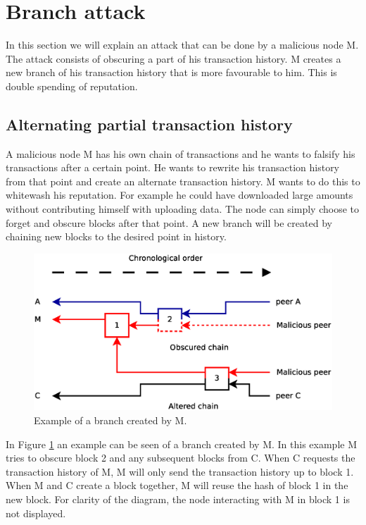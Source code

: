 \section{Branch attack}
\label{sect:branch}
In this section we will explain an attack that can be done by a malicious node M.
The attack consists of obscuring a part of his transaction history.
M creates a new branch of his transaction history that is more favourable to him.
This is double spending of reputation.

\subsection{Alternating partial transaction history}
A malicious node M has his own chain of transactions
and he wants to falsify his transactions after a certain point.
He wants to rewrite his transaction history from that point and create an alternate transaction history.
M wants to do this to whitewash his reputation.
For example he could have downloaded large amounts without contributing himself with uploading data.
The node can simply choose to forget and obscure blocks after that point.
A new branch will be created by chaining new blocks to the desired point in history.

\begin{figure}
	\centerline{\includegraphics[scale=0.3]{problems/figs/branch.eps}}
	\caption{Example of a branch created by M.}
	\label{fig:problem-branch-obscure}
\end{figure}

In Figure \ref{fig:problem-branch-obscure} an example can be seen of a branch created by M.
In this example M tries to obscure block 2 and any subsequent blocks from C.
When C requests the transaction history of M, M will only send the transaction history up to block 1.
When M and C create a block together,
M will reuse the hash of block 1 in the new block.
For clarity of the diagram, the node interacting with M in block 1 is not displayed.

